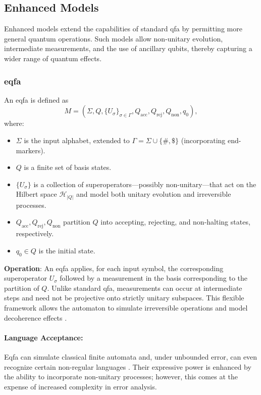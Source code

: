 \subsection{Enhanced Models}
\label{subsec:enhanced-models}

Enhanced models extend the capabilities of standard qfa by permitting more general quantum operations. Such models allow non-unitary evolution, intermediate measurements, and the use of ancillary qubits, thereby capturing a wider range of quantum effects.

\subsubsection{\acrfull{eqfa}}
\label{sssec:eqfa}
\begin{definition}
An \gls{eqfa} is defined as 
\[
M = (\Sigma, Q, \{U_\sigma\}_{\sigma\in\Gamma}, Q_{\text{acc}}, Q_{\text{rej}}, Q_{\text{non}}, q_0),
\]
where:
\begin{itemize}
    \item \( \Sigma \) is the input alphabet, extended to \(\Gamma = \Sigma \cup \{ \#, \$\}\) (incorporating end-markers).
    \item \( Q \) is a finite set of basis states.
    \item \( \{U_\sigma\} \) is a collection of superoperators—possibly non-unitary—that act on the Hilbert space \(\mathcal{H}_{|Q|}\) and model both unitary evolution and irreversible processes.
    \item \( Q_{\text{acc}}, Q_{\text{rej}}, Q_{\text{non}} \) partition \( Q \) into accepting, rejecting, and non-halting states, respectively.
    \item \( q_0 \in Q \) is the initial state.
\end{itemize}
\end{definition}

\textbf{Operation}:  
An \gls{eqfa} applies, for each input symbol, the corresponding superoperator \( U_\sigma \) followed by a measurement in the basis corresponding to the partition of \( Q \). Unlike standard qfa, measurements can occur at intermediate steps and need not be projective onto strictly unitary subspaces. This flexible framework allows the automaton to simulate irreversible operations and model decoherence effects \cite{paschen2000quantum}.

\paragraph{Language Acceptance:}  
Eqfa can simulate classical finite automata and, under unbounded error, can even recognize certain non-regular languages \cite{nayak1999optimal}. Their expressive power is enhanced by the ability to incorporate non-unitary processes; however, this comes at the expense of increased complexity in error analysis.

